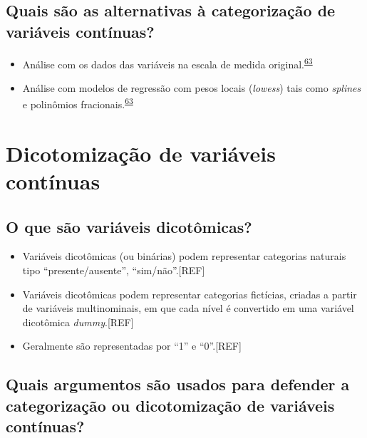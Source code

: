 \documentclass[
  a4paper,
]{book}
\begin{document}
\hypertarget{quais-suxe3o-as-alternativas-uxe0-categorizauxe7uxe3o-de-variuxe1veis-contuxednuas}{%
\subsection{Quais são as alternativas à categorização de variáveis contínuas?}\label{quais-suxe3o-as-alternativas-uxe0-categorizauxe7uxe3o-de-variuxe1veis-contuxednuas}}

\begin{itemize}
\item
  Análise com os dados das variáveis na escala de medida original.\textsuperscript{\protect\hyperlink{ref-MacCallum2002}{63}}
\item
  Análise com modelos de regressão com pesos locais (\emph{lowess}) tais como \emph{splines} e polinômios fracionais.\textsuperscript{\protect\hyperlink{ref-MacCallum2002}{63}}
\end{itemize}

\hypertarget{dicotomizacao}{%
\section{Dicotomização de variáveis contínuas}\label{dicotomizacao}}

\hypertarget{o-que-suxe3o-variuxe1veis-dicotuxf4micas}{%
\subsection{O que são variáveis dicotômicas?}\label{o-que-suxe3o-variuxe1veis-dicotuxf4micas}}

\begin{itemize}
\item
  Variáveis dicotômicas (ou binárias) podem representar categorias naturais tipo ``presente/ausente'', ``sim/não''.{[}REF{]}
\item
  Variáveis dicotômicas podem representar categorias fictícias, criadas a partir de variáveis multinominais, em que cada nível é convertido em uma variável dicotômica \emph{dummy}.{[}REF{]}
\item
  Geralmente são representadas por ``1'' e ``0''.{[}REF{]}
\end{itemize}

\hypertarget{quais-argumentos-suxe3o-usados-para-defender-a-categorizauxe7uxe3o-ou-dicotomizauxe7uxe3o-de-variuxe1veis-contuxednuas}{%
\subsection{Quais argumentos são usados para defender a categorização ou dicotomização de variáveis contínuas?}\label{quais-argumentos-suxe3o-usados-para-defender-a-categorizauxe7uxe3o-ou-dicotomizauxe7uxe3o-de-variuxe1veis-contuxednuas}}
\end{document}
